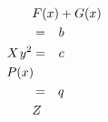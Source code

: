 \documentclass{article}
\def\nn{\nonumber}
\def\eeq{\end{eqnarray}}
\begin{document}
\begin{eqnarray}
\lefteqn{F(x)+G(x)} \nn \\
&=& b \\
\lefteqn{X}\quad y^2 &=& c \\
\lefteqn{P(x)} \hspace*{2em} \nn \\
&=& q \\
\lefteqn{Z}
\eeq
\end{document}
